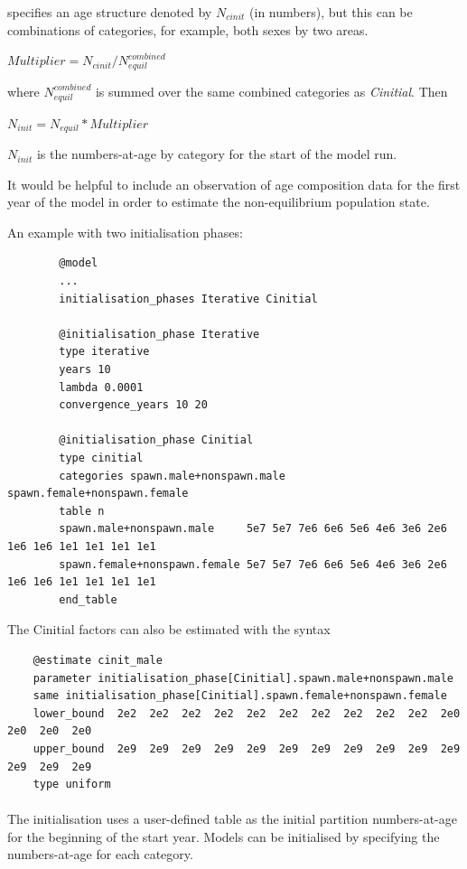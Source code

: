  specifies an age structure denoted by $N_{cinit}$ (in numbers), but this can be combinations of categories, for example, both sexes by two areas.

$Multiplier =  N_{cinit} / N_{equil}^{combined}$

where $N_{equil}^{combined} $ is summed over the same combined categories as \textit{Cinitial}. Then

$N_{init} =  N_{equil} * Multiplier $

$N_{init}$ is the numbers-at-age by category for the start of the model run.

It would be helpful to include an observation of age composition data for the first year of the model in order to estimate the non-equilibrium population state.

An example with two initialisation phases:

{\small{\begin{verbatim}
		@model
		...
		initialisation_phases Iterative Cinitial

		@initialisation_phase Iterative
		type iterative
		years 10
		lambda 0.0001
		convergence_years 10 20

		@initialisation_phase Cinitial
		type cinitial
		categories spawn.male+nonspawn.male spawn.female+nonspawn.female
		table n
		spawn.male+nonspawn.male     5e7 5e7 7e6 6e6 5e6 4e6 3e6 2e6 1e6 1e6 1e1 1e1 1e1 1e1
		spawn.female+nonspawn.female 5e7 5e7 7e6 6e6 5e6 4e6 3e6 2e6 1e6 1e6 1e1 1e1 1e1 1e1
		end_table
		\end{verbatim}}}

The Cinitial factors can also be estimated with the syntax

{\small{\begin{verbatim}
	@estimate cinit_male
	parameter initialisation_phase[Cinitial].spawn.male+nonspawn.male
	same initialisation_phase[Cinitial].spawn.female+nonspawn.female
	lower_bound  2e2  2e2  2e2  2e2  2e2  2e2  2e2  2e2  2e2  2e2  2e0  2e0  2e0  2e0
	upper_bound  2e9  2e9  2e9  2e9  2e9  2e9  2e9  2e9  2e9  2e9  2e9  2e9  2e9  2e9
	type uniform
	\end{verbatim}}}

\paragraph{}\label{sec:InitialisationPhase-StateCategoryByAge}\label{sec:Process-LoadPartition}

The  initialisation uses a user-defined table as the initial partition numbers-at-age for the beginning of the  start year. Models can be initialised by specifying the numbers-at-age for each category.

